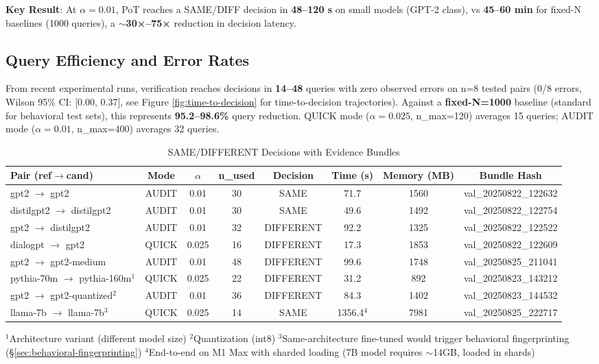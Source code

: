 \documentclass{article}
\begin{document}
\textbf{Key Result}: At $\alpha = 0.01$, PoT reaches a SAME/DIFF decision in \textbf{48--120 s} on small models (GPT-2 class), vs \textbf{45--60 min} for fixed-N baselines (1000 queries), a \textbf{$\sim$30×--75×} reduction in decision latency.

\subsection{Query Efficiency and Error Rates}

From recent experimental runs, verification reaches decisions in \textbf{14--48} queries with zero observed errors on n=8 tested pairs (0/8 errors, Wilson 95\% CI: [0.00, 0.37], see Figure \ref{fig:time-to-decision} for time-to-decision trajectories). Against a \textbf{fixed-N=1000} baseline (standard for behavioral test sets), this represents \textbf{95.2--98.6\%} query reduction. QUICK mode ($\alpha=0.025$, n\_max=120) averages 15 queries; AUDIT mode ($\alpha=0.01$, n\_max=400) averages 32 queries.

\begin{table}[h]
\centering
\caption{SAME/DIFFERENT Decisions with Evidence Bundles}
\label{tab:decisions}
\begin{tabular}{lccccccc}
\toprule
Pair (ref$\rightarrow$cand) & Mode & $\alpha$ & n\_used & Decision & Time (s) & Memory (MB) & Bundle Hash \\
\midrule
gpt2 $\rightarrow$ gpt2 & AUDIT & 0.01 & 30 & SAME & 71.7 & 1560 & val\_20250822\_122632 \\
distilgpt2 $\rightarrow$ distilgpt2 & AUDIT & 0.01 & 30 & SAME & 49.6 & 1492 & val\_20250822\_122754 \\
gpt2 $\rightarrow$ distilgpt2 & AUDIT & 0.01 & 32 & DIFFERENT & 92.2 & 1325 & val\_20250822\_122522 \\
dialogpt $\rightarrow$ gpt2 & QUICK & 0.025 & 16 & DIFFERENT & 17.3 & 1853 & val\_20250822\_122609 \\
gpt2 $\rightarrow$ gpt2-medium & AUDIT & 0.01 & 48 & DIFFERENT & 99.6 & 1748 & val\_20250825\_211041 \\
pythia-70m $\rightarrow$ pythia-160m$^1$ & QUICK & 0.025 & 22 & DIFFERENT & 31.2 & 892 & val\_20250823\_143212 \\
gpt2 $\rightarrow$ gpt2-quantized$^2$ & AUDIT & 0.01 & 36 & DIFFERENT & 84.3 & 1402 & val\_20250823\_144532 \\
llama-7b $\rightarrow$ llama-7b$^3$ & QUICK & 0.025 & 14 & SAME & 1356.4$^4$ & 7981 & val\_20250825\_222717 \\
\bottomrule
\end{tabular}

\footnotesize{$^1$Architecture variant (different model size) $^2$Quantization (int8) $^3$Same-architecture fine-tuned would trigger behavioral fingerprinting (\S\ref{sec:behavioral-fingerprinting}) $^4$End-to-end on M1 Max with sharded loading (7B model requires $\sim$14GB, loaded in shards)}
\end{table}
\end{document}
